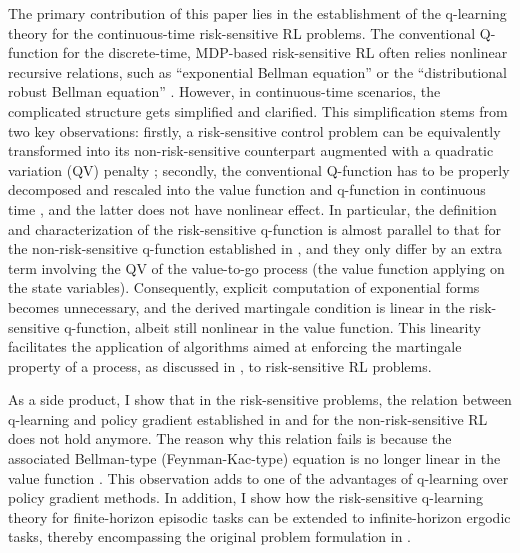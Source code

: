 The primary contribution of this paper lies in the establishment of the q-learning theory for the continuous-time risk-sensitive RL problems. The conventional Q-function for the discrete-time, MDP-based risk-sensitive RL often relies nonlinear recursive relations, such as ``exponential Bellman equation'' \citep{fei2021exponential} or the ``distributional robust Bellman equation'' \citep{wang2023finite}. However, in continuous-time scenarios, the complicated structure gets simplified and clarified. This simplification stems from two key observations: firstly, a risk-sensitive control problem can be equivalently transformed into its non-risk-sensitive counterpart augmented with a quadratic variation (QV) penalty \citep{skiadas2003robust}; secondly, the conventional Q-function has to be properly decomposed and rescaled into the value function and q-function in continuous time \citep{jia2022q}, and the latter does not have nonlinear effect. In particular, the definition and characterization of the risk-sensitive q-function is almost parallel to that for the non-risk-sensitive q-function established in \citet{jia2022q}, and they only differ by an extra term involving the QV of the value-to-go process (the value function applying on the state variables). Consequently, explicit computation of exponential forms becomes unnecessary, and the derived martingale condition is linear in the risk-sensitive q-function, albeit still nonlinear in the value function. This linearity facilitates the application of algorithms aimed at enforcing the martingale property of a process, as discussed in \citet{jia2022policy}, to risk-sensitive RL problems.  


As a side product, I show that in the risk-sensitive problems, the relation between q-learning and policy gradient established in \cite{schulman2017equivalence} and \cite{jia2022q} for the non-risk-sensitive RL does not hold anymore. The reason why this relation fails is because the associated Bellman-type (Feynman-Kac-type) equation is no longer linear in the value function \citep{nagai1996bellman}. This observation adds to one of the advantages of q-learning over policy gradient methods. In addition, I show how the risk-sensitive q-learning theory for finite-horizon episodic tasks can be extended to infinite-horizon ergodic tasks, thereby encompassing the original problem formulation in \citet{bielecki1999risk}. 

